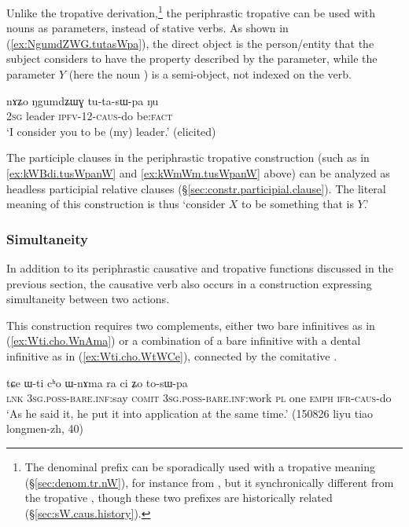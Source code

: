 Unlike the  tropative derivation,\footnote{The  denominal prefix can be sporadically used with a tropative meaning (§\ref{sec:denom.tr.nW}), for instance   from , but it synchronically different from the tropative , though these two prefixes are historically related (§\ref{sec:sW.caus.history}). } the  periphrastic tropative can be used with nouns as parameters, instead of stative verbs. As shown in (\ref{ex:NgumdZWG.tutasWpa}), the direct object is the person/entity that the subject considers to have the property described by the parameter, while the parameter $Y$ (here the noun ) is a semi-object, not indexed on the verb.

\begin{exe}
\ex \label{ex:NgumdZWG.tutasWpa}
\gll nɤʑo ŋgumdʑɯɣ tu-ta-sɯ-pa ŋu \\
\textsc{2sg} leader \textsc{ipfv}-1\fl{}2-\textsc{caus}-do be:\textsc{fact} \\
\glt `I consider you to be (my) leader.' (elicited)
\end{exe}

The participle clauses in the periphrastic tropative construction (such as in \ref{ex:kWBdi.tusWpanW} and \ref{ex:kWmWm.tusWpanW} above) can be analyzed as headless participial relative clauses (§\ref{sec:constr.participial.clause}). The literal meaning of this construction is thus `consider $X$ to be something that is $Y$.' 


\subsubsection{Simultaneity} \label{sec:bare.dental.inf.sWpa}
In addition to its periphrastic causative and tropative functions discussed in the previous section, the causative verb  also occurs in a construction expressing simultaneity between two actions. 

This construction requires two complements, either two bare infinitives as in (\ref{ex:Wti.cho.WnAma}) or a combination of a bare infinitive with a dental infinitive as in (\ref{ex:Wti.cho.WtWCe}), connected by the comitative .

\begin{exe} 
\ex \label{ex:Wti.cho.WnAma}
\gll tɕe ɯ-ti cʰo ɯ-nɤma ra ci ʑo to-sɯ-pa \\
\textsc{lnk} \textsc{3sg}.\textsc{poss}-\textsc{bare}.\textsc{inf}:say \textsc{comit} \textsc{3sg}.\textsc{poss}-\textsc{bare}.\textsc{inf}:work \textsc{pl} one \textsc{emph} \textsc{ifr}-\textsc{caus}-do \\
\glt `As he said it, he put it into application at the same time.' (150826 liyu tiao longmen-zh, 40)
\end{exe} 

